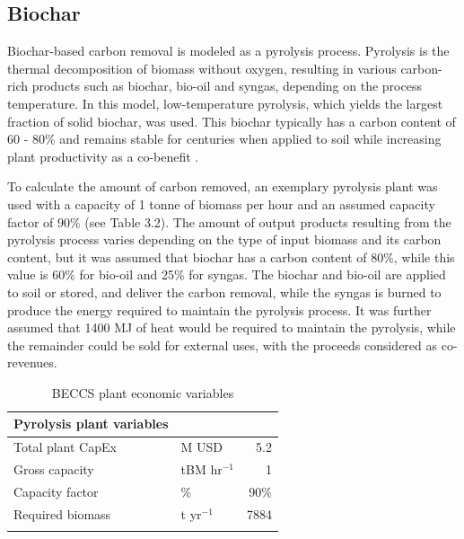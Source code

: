 \subsection{Biochar}
Biochar-based carbon removal is modeled as a pyrolysis process. Pyrolysis is the thermal decomposition of biomass without oxygen, resulting in various carbon-rich products such as biochar, bio-oil and syngas, depending on the process temperature. In this model, low-temperature pyrolysis, which yields the largest fraction of solid biochar, was used. This biochar typically has a carbon content of 60 - 80\% and remains stable for centuries when applied to soil while increasing plant productivity as a co-benefit \parencite{bergero_biochar_2024}.\vspace{2mm}

To calculate the amount of carbon removed, an  exemplary pyrolysis plant was used with a capacity of 1 tonne of biomass per hour and an assumed capacity factor of 90\% (see Table 3.2). The amount of output products resulting from the pyrolysis process varies depending on the type of input biomass and its carbon content, but it was assumed that biochar has a carbon content of 80\%, while this value is 60\% for bio-oil and 25\% for syngas. The biochar and bio-oil are applied to soil or stored, and deliver the carbon removal, while the syngas is burned to produce the energy required to maintain the pyrolysis process. It was further assumed that 1400 MJ of heat would be required to maintain the pyrolysis, while the remainder could be sold for external uses, with the proceeds considered as co-revenues.\vspace{2mm}

\begin{table}
\small
\renewcommand{\arraystretch}{1.3}
\begin{tabular}{llr}
\hline
\textbf{Pyrolysis plant variables} &          &                \\ \hline
Total plant CapEx  & M USD       & 5.2           \\
Gross capacity & tBM hr$^{-1}$       & 1            \\
Capacity factor & \%        & 90\%            \\
Required biomass & t yr$^{-1}$ & 7884      \\ \hline
\\
\end{tabular}
\vspace*{-\baselineskip}
\caption{BECCS plant economic variables}
\end{table}

